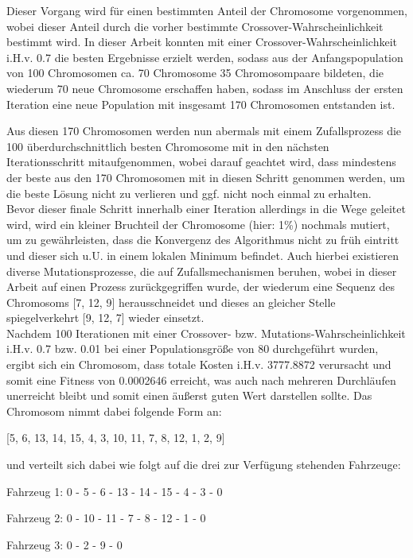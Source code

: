 \documentclass[a4paper,12pt,parskip,bibtotoc,liststotoc]{article}
\begin{document}
Dieser Vorgang wird für einen bestimmten Anteil der Chromosome vorgenommen, wobei dieser Anteil durch die vorher bestimmte Crossover-Wahrscheinlichkeit bestimmt wird. 
In dieser Arbeit konnten mit einer Crossover-Wahrscheinlichkeit i.H.v. 0.7 die besten Ergebnisse erzielt werden, sodass aus der Anfangspopulation von 100 Chromosomen ca. 70 Chromosome 35 Chromosompaare bildeten, die wiederum 70 neue Chromosome erschaffen haben, sodass im Anschluss der ersten Iteration eine neue Population mit insgesamt 170 Chromosomen entstanden ist. 

Aus diesen 170 Chromosomen werden nun abermals mit einem Zufallsprozess die 100 überdurchschnittlich besten Chromosome mit in den nächsten Iterationsschritt mitaufgenommen, wobei darauf geachtet wird, dass mindestens der beste aus den 170 Chromosomen mit in diesen Schritt genommen werden, um die beste Lösung nicht zu verlieren und ggf. nicht noch einmal zu erhalten.\\ 

Bevor dieser finale Schritt innerhalb einer Iteration allerdings in die Wege geleitet wird, wird ein kleiner Bruchteil der Chromosome (hier: 1\%) nochmals mutiert, um zu gewährleisten, dass die Konvergenz des Algorithmus nicht zu früh eintritt und dieser sich u.U. in einem lokalen Minimum befindet. 
Auch hierbei existieren diverse Mutationsprozesse, die auf Zufallsmechanismen beruhen, wobei in dieser Arbeit auf einen Prozess zurückgegriffen wurde, der wiederum eine Sequenz des Chromosoms [7, 12, 9] herausschneidet und dieses an gleicher Stelle spiegelverkehrt [9, 12, 7] wieder einsetzt.\\

Nachdem 100 Iterationen mit einer Crossover- bzw. Mutations-Wahrscheinlichkeit i.H.v. 0.7 bzw. 0.01 bei einer Populationsgröße von 80 durchgeführt wurden, ergibt sich ein Chromosom, dass totale Kosten i.H.v. 3777.8872 verursacht und somit eine Fitness von 0.0002646 erreicht, was auch nach mehreren Durchläufen unerreicht bleibt und somit einen äußerst guten Wert darstellen sollte.
Das Chromosom nimmt dabei folgende Form an: 

\begin{center}
[5, 6, 13, 14, 15, 4, 3, 10, 11, 7, 8, 12, 1, 2, 9]
\end{center}

und verteilt sich dabei wie folgt auf die drei zur Verfügung stehenden Fahrzeuge: 

\begin{center}
Fahrzeug 1: 0 - 5 - 6 - 13 - 14 - 15 - 4 - 3 - 0

Fahrzeug 2: 0 - 10 - 11 - 7 - 8 - 12 - 1 - 0

Fahrzeug 3: 0 - 2 - 9 - 0
\end{center}
\end{document}
